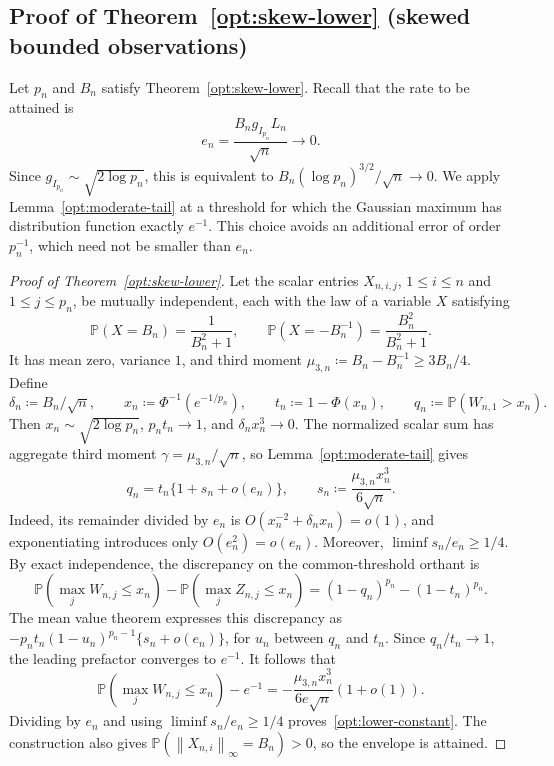 \documentclass[11pt,letterpaper]{article}
\newenvironment{vSixBlock}{\color{magenta}}{}
\theoremstyle{remark}
\newcommand{\Pp}{\mathbb P}
\newcommand{\norm}[1]{\left\lVert#1\right\rVert}
\begin{document}
\begin{vSixBlock}
\subsection{Proof of Theorem~\ref*{opt:skew-lower} (skewed bounded observations)}

\label{app:skew-proof}
Let \(p_n\) and \(B_n\) satisfy Theorem~\ref{opt:skew-lower}.
Recall that the rate to be attained is
\[
 e_n=\frac{B_n g_{I_{p_n}}L_n}{\sqrt n}\longrightarrow0.
\]
Since \(g_{I_{p_n}}\sim\sqrt{2\log p_n}\), this is equivalent to \(B_n(\log p_n)^{3/2}/\sqrt n\to0\). We apply Lemma~\ref{opt:moderate-tail} at a threshold for which the
Gaussian maximum has distribution function exactly \(e^{-1}\).
This choice avoids an additional error of order \(p_n^{-1}\),
which need not be smaller than \(e_n\).

\begin{proof}[Proof of Theorem~\ref{opt:skew-lower}]
Let the scalar entries \(X_{n,i,j}\), \(1\le i\le n\) and
\(1\le j\le p_n\), be mutually independent, each with the law of a
variable \(X\) satisfying
\begin{equation}
 \Pp(X=B_n)=\frac1{B_n^2+1},\qquad
 \Pp(X=-B_n^{-1})=\frac{B_n^2}{B_n^2+1}.
 \label{opt:two-point-law}
\end{equation}
It has mean zero, variance \(1\), and third moment
\(\mu_{3,n}\coloneqq B_n-B_n^{-1}\ge3B_n/4\). {Define}
\[
 \delta_n\coloneqq B_n/\sqrt n,\qquad
 x_n\coloneqq\Phi^{-1}(e^{-1/p_n}),\qquad
 t_n\coloneqq1-\Phi(x_n),\qquad q_n\coloneqq\Pp(W_{n,1}>x_n).
\]
Then \(x_n\sim\sqrt{2\log p_n}\), \(p_nt_n\to1\), and
\(\delta_nx_n^3\to0\). The normalized scalar sum has aggregate
third moment \(\gamma=\mu_{3,n}/\sqrt n\), so
Lemma~\ref{opt:moderate-tail} gives
\begin{equation}
 q_n=t_n\{1+s_n+o(e_n)\},\qquad
 s_n\coloneqq\frac{\mu_{3,n}x_n^3}{6\sqrt n}.
 \label{opt:tail-linearization}
\end{equation}
Indeed, its remainder divided by \(e_n\) is
\(O(x_n^{-2}+\delta_nx_n)=o(1)\), and exponentiating introduces only
\(O(e_n^2)=o(e_n)\). Moreover,
\(\liminf s_n/e_n\ge1/4\).
By exact independence, the discrepancy on the common-threshold orthant is
\[
 \Pp(\max_jW_{n,j}\le x_n)-\Pp(\max_jZ_{n,j}\le x_n)
 =(1-q_n)^{p_n}-(1-t_n)^{p_n}.
\]
The mean value theorem expresses this discrepancy as
\(-p_nt_n(1-u_n)^{p_n-1}\{s_n+o(e_n)\}\), for \(u_n\) between
\(q_n\) and \(t_n\). Since \(q_n/t_n\to1\), the leading prefactor
converges to \(e^{-1}\). It follows that
\begin{equation}
 \Pp(\max_jW_{n,j}\le x_n)-e^{-1}
 =-\frac{\mu_{3,n}x_n^3}{6e\sqrt n}(1+o(1)).
 \label{opt:exact-product-asymptotic}
\end{equation}
Dividing by \(e_n\) and using
\(\liminf s_n/e_n\ge1/4\) proves~\eqref{opt:lower-constant}.
The construction also gives
\(\Pp(\norm{X_{n,i}}_\infty=B_n)>0\), so the envelope is attained.
\end{proof}

\end{vSixBlock}
\end{document}
